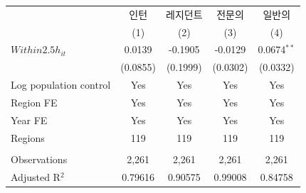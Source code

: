 \begingroup
\centering
\begin{tabular}{lcccc}
   \toprule
                          & 인턴     & 레지던트 & 전문의   & 일반의 \\   
                          & (1)      & (2)      & (3)      & (4)\\  
   \midrule 
   $Within2.5h_{it}$      & 0.0139   & -0.1905  & -0.0129  & 0.0674$^{**}$\\   
                          & (0.0855) & (0.1999) & (0.0302) & (0.0332)\\   
   Log population control & Yes      & Yes      & Yes      & Yes\\  
   Region FE              & Yes      & Yes      & Yes      & Yes\\  
   Year FE                & Yes      & Yes      & Yes      & Yes\\  
   Regions                & 119      & 119      & 119      & 119\\  
    \\
   Observations           & 2,261    & 2,261    & 2,261    & 2,261\\  
   Adjusted R$^2$         & 0.79616  & 0.90575  & 0.99008  & 0.84758\\  
   \bottomrule
\end{tabular}
\par\endgroup
